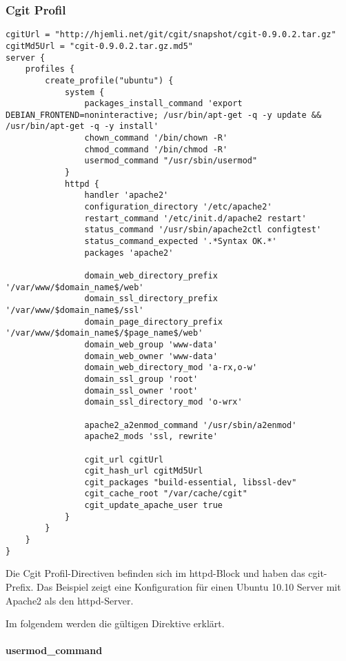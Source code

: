 \subsubsection{Cgit Profil}

\begin{lstlisting}[style=Java, caption=Beispiel Cgit Profil]
cgitUrl = "http://hjemli.net/git/cgit/snapshot/cgit-0.9.0.2.tar.gz"
cgitMd5Url = "cgit-0.9.0.2.tar.gz.md5"
server {
    profiles {
        create_profile("ubuntu") {
            system {
                packages_install_command 'export DEBIAN_FRONTEND=noninteractive; /usr/bin/apt-get -q -y update && /usr/bin/apt-get -q -y install'
                chown_command '/bin/chown -R'
                chmod_command '/bin/chmod -R'
                usermod_command "/usr/sbin/usermod"
            }
            httpd {
                handler 'apache2'
                configuration_directory '/etc/apache2'
                restart_command '/etc/init.d/apache2 restart'
                status_command '/usr/sbin/apache2ctl configtest'
                status_command_expected '.*Syntax OK.*'
                packages 'apache2'

                domain_web_directory_prefix '/var/www/$domain_name$/web'
                domain_ssl_directory_prefix '/var/www/$domain_name$/ssl'
                domain_page_directory_prefix '/var/www/$domain_name$/$page_name$/web'
                domain_web_group 'www-data'
                domain_web_owner 'www-data'
                domain_web_directory_mod 'a-rx,o-w'
                domain_ssl_group 'root'
                domain_ssl_owner 'root'
                domain_ssl_directory_mod 'o-wrx'

                apache2_a2enmod_command '/usr/sbin/a2enmod'
                apache2_mods 'ssl, rewrite'

                cgit_url cgitUrl
                cgit_hash_url cgitMd5Url
                cgit_packages "build-essential, libssl-dev"
                cgit_cache_root "/var/cache/cgit"
                cgit_update_apache_user true
            }
        }
    }
}
\end{lstlisting}

Die Cgit Profil-Directiven befinden sich im httpd-Block und haben das cgit-Prefix. Das Beispiel zeigt eine Konfiguration für einen Ubuntu 10.10 Server mit Apache2 als den httpd-Server.

Im folgendem werden die gültigen Direktive erklärt.

\paragraph{usermod\_command}

